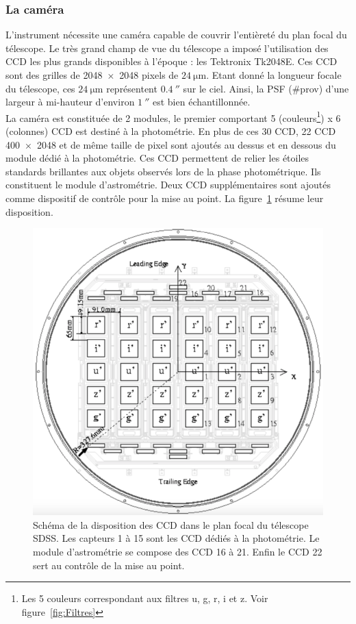 \documentclass[11pt, twoside, a4paper, openright]{report}
\begin{document}
\subsubsection{La caméra}
L'instrument nécessite une caméra \autocite{Gunn1998} capable de couvrir l'entièreté du plan focal du télescope. Le très grand champ de vue du télescope a imposé l'utilisation des CCD les plus grands disponibles à l'époque : les Tektronix Tk2048E. Ces CCD sont des grilles de \num{2048x2048} pixels de $\SI{24}{\micro\meter}$. Etant donné la longueur focale du télescope, ces $\SI{24}{\micro\meter}$ représentent $\SI{0,4}{\arcsecond}$ sur le ciel. Ainsi, la PSF (\#prov) d'une largeur à mi-hauteur d'environ $\SI{1}{\arcsecond}$ est bien échantillonnée. \\
La caméra est constituée de 2 modules, le premier comportant 5 (couleurs\footnote{Les 5 couleurs correspondant aux filtres u, g, r, i et z. Voir figure~\ref{fig:Filtres}}) x 6 (colonnes) CCD est destiné à la photométrie. En plus de ces 30 CCD, 22 CCD \num{400x2048} et de même taille de pixel sont ajoutés au dessus et en dessous du module dédié à la photométrie. Ces CCD permettent de relier les étoiles standards brillantes aux objets observés lors de la phase photométrique. Ils constituent le module d'astrométrie. Deux CCD supplémentaires sont ajoutés comme dispositif de contrôle pour la mise au point. La figure~\ref{fig:CcdSchema} résume leur disposition.
\begin{figure}
  \centering
  \includegraphics[scale=0.3]{CcdSchema}
  \caption{Schéma de la disposition des CCD dans le plan focal du télescope SDSS. Les capteurs 1 à 15 sont les CCD dédiés à la photométrie. Le module d'astrométrie se compose des CCD 16 à 21. Enfin le CCD 22 sert au contrôle de la mise au point.}
  \label{fig:CcdSchema}
\end{figure}
\end{document}
